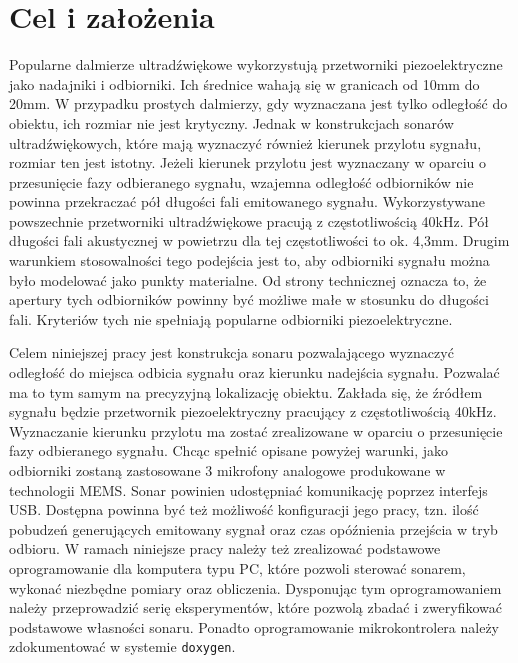 \chapter{Cel i założenia}\label{ch_02}

Popularne dalmierze ultradźwiękowe wykorzystują przetworniki piezoelektryczne
jako nadajniki i odbiorniki. Ich średnice wahają się w granicach
od 10mm do 20mm.
W przypadku prostych dalmierzy, gdy wyznaczana jest tylko odległość do
obiektu, ich rozmiar nie jest krytyczny.
Jednak w konstrukcjach sonarów ultradźwiękowych, które mają wyznaczyć
również kierunek przylotu sygnału, rozmiar ten jest istotny.
Jeżeli kierunek przylotu jest wyznaczany w oparciu o przesunięcie
fazy odbieranego sygnału, wzajemna odległość odbiorników nie powinna
przekraczać pół długości fali emitowanego sygnału.
Wykorzystywane powszechnie przetworniki ultradźwiękowe pracują z częstotliwością
40kHz. Pół długości fali akustycznej w powietrzu dla tej częstotliwości
to ok. 4,3mm. Drugim warunkiem stosowalności tego podejścia
jest to, aby odbiorniki sygnału można było modelować jako punkty materialne.
Od strony technicznej oznacza to, że apertury tych odbiorników powinny być
możliwe małe w stosunku do długości fali.
Kryteriów tych nie spełniają popularne odbiorniki piezoelektryczne.

Celem niniejszej pracy jest konstrukcja sonaru pozwalającego wyznaczyć
odległość do miejsca odbicia sygnału oraz kierunku nadejścia sygnału.
Pozwalać ma to tym samym na precyzyjną lokalizację obiektu.
Zakłada się, że źródłem sygnału będzie przetwornik piezoelektryczny
pracujący z częstotliwością 40kHz.
Wyznaczanie kierunku przylotu ma zostać zrealizowane w oparciu
o przesunięcie fazy odbieranego sygnału. Chcąc spełnić opisane powyżej
warunki, jako odbiorniki zostaną zastosowane 3 mikrofony analogowe
produkowane w technologii MEMS.
Sonar powinien udostępniać komunikację poprzez interfejs USB.
Dostępna powinna być też możliwość konfiguracji jego pracy,
tzn. ilość pobudzeń generujących emitowany sygnał oraz czas opóźnienia
przejścia w tryb odbioru.
W ramach niniejsze pracy należy też zrealizować podstawowe oprogramowanie
dla komputera typu PC, które pozwoli sterować sonarem, wykonać
niezbędne pomiary oraz obliczenia. Dysponując tym oprogramowaniem
należy przeprowadzić serię eksperymentów, które pozwolą zbadać i zweryfikować
podstawowe własności sonaru. Ponadto oprogramowanie mikrokontrolera
należy zdokumentować w systemie {\tt doxygen}.
